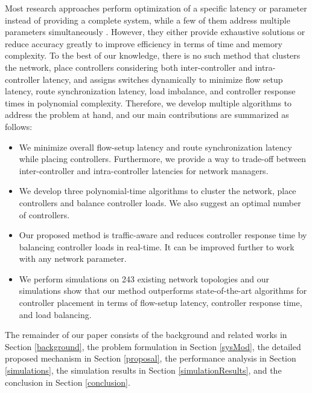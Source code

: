 \documentclass[final,5p,times]{cas-dc}
\begin{document}
	Most research approaches perform optimization of a specific latency or parameter instead of providing a complete system, while a few of them address multiple parameters simultaneously \cite{lange2015multi, sallahi2015optimal}. However, they either provide exhaustive solutions or reduce accuracy greatly to improve efficiency in terms of time and memory complexity. To the best of our knowledge, there is no such method that clusters the network, place controllers considering both inter-controller and intra-controller latency, and assigns switches dynamically to minimize flow setup latency, route synchronization latency, load imbalance, and controller response times in polynomial complexity. Therefore, we develop multiple algorithms to address the problem at hand, and our main contributions are summarized as follows:
	\begin{itemize}
		\item We minimize overall flow-setup latency and route synchronization latency while placing controllers. Furthermore, we provide a way to trade-off between inter-controller and intra-controller latencies for network managers.
		
		\item We develop three polynomial-time algorithms to cluster the network, place controllers and balance controller loads. We also suggest an optimal number of controllers.
		
		\item Our proposed method is traffic-aware and reduces controller response time by balancing controller loads in real-time. It can be improved further to work with any network parameter.
		
		\item We perform simulations on 243 existing network topologies and our simulations show that our method outperforms state-of-the-art algorithms for controller placement in terms of flow-setup latency, controller response time, and load balancing.
	\end{itemize}
	
 	
 	The remainder of our paper consists of the background and related works in Section \ref{background}, the problem formulation in Section \ref{sysMod}, the detailed proposed mechanism in Section \ref{proposal}, the performance analysis in Section \ref{simulations}, the simulation results in Section \ref{simulationResults}, and the conclusion in Section \ref{conclusion}.
	
\end{document}
